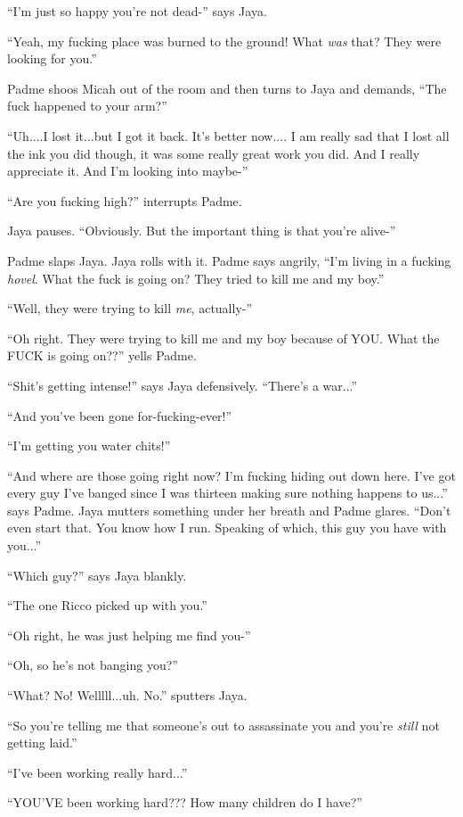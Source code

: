 ``I'm just so happy you're not dead-'' says Jaya.

``Yeah, my fucking place was burned to the ground!  What \textit{was }that?  They were looking for you.''

Padme shoos Micah out of the room and then turns to Jaya and demands, ``The fuck happened to your arm?''

``Uh....I lost it...but I got it back.  It's better now.... I am really sad that I lost all the ink you did though, it was some really great work you did.  And I really appreciate it.  And I'm looking into maybe-''

``Are you fucking high?'' interrupts Padme.

Jaya pauses.  ``Obviously.  But the important thing is that you're alive-''

Padme slaps Jaya.  Jaya rolls with it.   Padme says angrily, ``I'm living in a fucking \textit{hovel}.  What the fuck is going on?  They tried to kill me and my boy.''

``Well, they were trying to kill \textit{me}, actually-''

``Oh right.  They were trying to kill me and my boy because of YOU.  What the FUCK is going on??'' yells Padme.

``Shit's getting intense!'' says Jaya defensively.  ``There's a war...''

``And you've been gone for-fucking-ever!''

``I'm getting you water chits!''

``And where are those going right now?  I'm fucking hiding out down here.  I've got every guy I've banged since I was thirteen making sure nothing happens to us...'' says Padme.  Jaya mutters something under her breath and Padme glares. ``Don't even start that.  You know how I run.  Speaking of which, this guy you have with you...''

``Which guy?'' says Jaya blankly.

``The one Ricco picked up with you.''

``Oh right, he was just helping me find you-''

``Oh, so he's not banging you?''

``What?  No!  Welllll...uh.  No.'' sputters Jaya.

``So you're telling me that someone's out to assassinate you and you're \textit{still} not getting laid.''

``I've been working really hard...''

``YOU'VE been working hard???  How many children do I have?''

